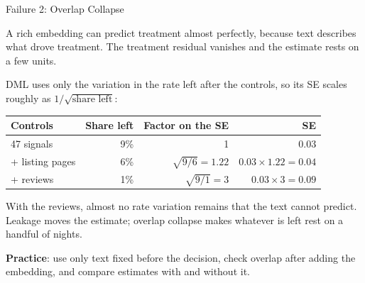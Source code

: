 \documentclass[aspectratio=169, 11pt, handout]{beamer}
\begin{document}
\begin{frame}{Failure 2: Overlap Collapse}

A rich embedding can predict treatment almost perfectly, because text describes what drove treatment. The treatment residual vanishes and the estimate rests on a few units.

\bigskip

DML uses only the variation in the rate left after the controls, so its SE scales roughly as $1/\sqrt{\text{share left}}$:

\begin{center}
\begin{tabular}{lrrr}
\toprule
\textbf{Controls} & \textbf{Share left} & \textbf{Factor on the SE} & \textbf{SE} \\
\midrule
47 signals & 9\% & 1 & 0.03 \\
+ listing pages & 6\% & $\sqrt{9/6} = 1.22$ & $0.03 \times 1.22 = 0.04$ \\
+ reviews & 1\% & $\sqrt{9/1} = 3$ & $0.03 \times 3 = 0.09$ \\
\bottomrule
\end{tabular}
\end{center}

\medskip

With the reviews, almost no rate variation remains that the text cannot predict. Leakage moves the estimate; overlap collapse makes whatever is left rest on a handful of nights.

\medskip

\textbf{Practice}: use only text fixed before the decision, check overlap after adding the embedding, and compare estimates with and without it.
\end{frame}
\end{document}
